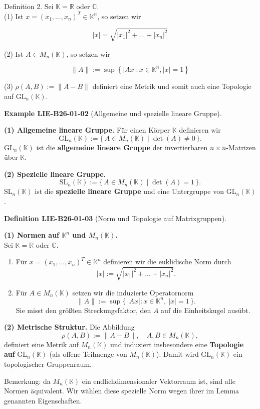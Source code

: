 \documentclass[10pt, letterpaper]{article}
\newcommand{\CustomHeading}[3]{%
  \par\medskip\noindent%
  \textbf{#1 #2} \textnormal{(#3)}.\enskip%
}
\newenvironment{DEF}[2]{\begin{unitbox}\CustomHeading{Definition}{#1}{#2}}{\end{unitbox}}
\newenvironment{EXA}[2]{\begin{unitbox}\CustomHeading{Example}{#1}{#2}}{\end{unitbox}}
\begin{document}
Definition 2. Sei $\mathbb{K}=\mathbb{R}$ oder $\mathbb{C}$.\\
(1) Ist $x=\left(x_{1}, \ldots, x_{n}\right)^{T} \in \mathbb{K}^{n}$, so setzen wir

$$
|x|=\sqrt{\left|x_{1}\right|^{2}+\ldots+\left|x_{n}\right|^{2}}
$$

(2) Ist $A \in M_{n}(\mathbb{K})$, so setzen wir

$$
\|A\|:=\sup \left\{|A x|: x \in \mathbb{K}^{n},|x|=1\right\}
$$

(3) $\rho(A, B):=\|A-B\|$ definiert eine Metrik und somit auch eine Topologie auf $\mathrm{GL}_{n}(\mathbb{K})$.



\begin{EXA}{LIE-B26-01-02}{Allgemeine und spezielle lineare Gruppe}
\textbf{(1) Allgemeine lineare Gruppe.}  
Für einen Körper $\mathbb{K}$ definieren wir
\[
\mathrm{GL}_{n}(\mathbb{K}) := \{\,A \in M_{n}(\mathbb{K}) \mid \det(A) \neq 0\,\}.
\]
$\mathrm{GL}_{n}(\mathbb{K})$ ist die \textbf{allgemeine lineare Gruppe} der invertierbaren $n\times n$-Matrizen über $\mathbb{K}$.

\textbf{(2) Spezielle lineare Gruppe.}  
\[
\mathrm{SL}_{n}(\mathbb{K}) := \{\,A \in M_{n}(\mathbb{K}) \mid \det(A) = 1\,\}.
\]
$\mathrm{SL}_{n}(\mathbb{K})$ ist die \textbf{spezielle lineare Gruppe} und eine Untergruppe von $\mathrm{GL}_{n}(\mathbb{K})$.
\end{EXA}



\begin{DEF}{LIE-B26-01-03}{Norm und Topologie auf Matrixgruppen}
\textbf{(1) Normen auf $\mathbb{K}^{n}$ und $M_{n}(\mathbb{K})$.}\\
Sei $\mathbb{K}=\mathbb{R}$ oder $\mathbb{C}$.
\begin{enumerate}
  \item Für $x=(x_{1},\ldots,x_{n})^{T}\in \mathbb{K}^{n}$ definieren wir die euklidische Norm durch
  \[
  |x| := \sqrt{|x_{1}|^{2}+\dots+|x_{n}|^{2}}.
  \]
  \item Für $A\in M_{n}(\mathbb{K})$ setzen wir die induzierte Operatornorm
  \[
  \|A\| := \sup\{\,|A x| : x\in \mathbb{K}^{n},\ |x|=1\,\}.
  \]
  Sie misst den größten Streckungsfaktor, den $A$ auf die Einheitskugel ausübt.
\end{enumerate}

\textbf{(2) Metrische Struktur.}  
Die Abbildung
\[
\rho(A,B):=\|A-B\|,\quad A,B\in M_{n}(\mathbb{K}),
\]
definiert eine Metrik auf $M_{n}(\mathbb{K})$ und induziert insbesondere eine \textbf{Topologie auf} $\mathrm{GL}_{n}(\mathbb{K})$ (als offene Teilmenge von $M_{n}(\mathbb{K})$).  
Damit wird $\mathrm{GL}_{n}(\mathbb{K})$ ein topologischer Gruppenraum.

Bemerkung: da $M_{n}(\mathbb{K})$ ein endlichdimensionaler Vektorraum ist, sind alle Normen äquivalent. Wir wählen diese spezielle Norm wegen ihrer im Lemma genannten Eigenschaften.
\end{DEF}
\end{document}

